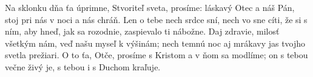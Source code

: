 Na sklonku dňa ťa úprimne,
Stvoriteľ sveta, prosíme:
láskavý Otec a náš Pán,
stoj pri nás v noci a nás chráň.
\versseparator
Len o tebe nech srdce sní,
nech vo sne cíti, že si s ním,
aby hneď, jak sa rozodnie,
zaspievalo ti nábožne.
\versseparator
Daj zdravie, milosť všetkým nám,
veď našu myseľ k výšinám;
nech temnú noc aj mrákavy
jas tvojho svetla prežiari.
\versseparator
O to ťa, Otče, prosíme
s Kristom a v ňom sa modlíme;
on s tebou večne živý je,
s tebou i s Duchom kraľuje.
